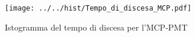 \begin{figure}[h] \centering \texttt{[image: ../../hist/Tempo\_di\_discesa\_MCP.pdf]}\caption{Istogramma del tempo di discesa per l'MCP-PMT}\label{hist:Tempo_di_discesa_MCP} \end{figure}
